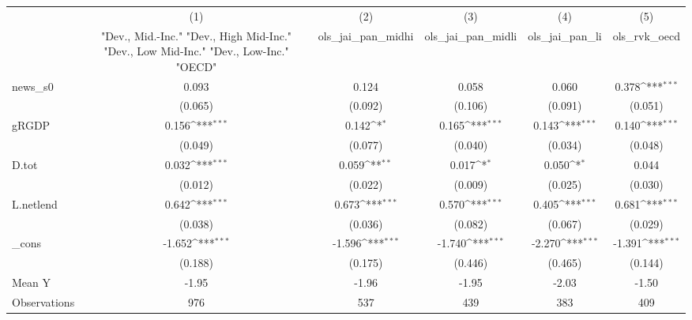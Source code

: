 {
\def\sym#1{\ifmmode^{#1}\else\(^{#1}\)\fi}
\begin{tabular}{l*{5}{c}}
\toprule
            &\multicolumn{1}{c}{(1)}&\multicolumn{1}{c}{(2)}&\multicolumn{1}{c}{(3)}&\multicolumn{1}{c}{(4)}&\multicolumn{1}{c}{(5)}\\
            &\multicolumn{1}{c}{ "Dev., Mid.-Inc." "Dev., High Mid-Inc." "Dev., Low Mid-Inc." "Dev., Low-Inc." "OECD" }&\multicolumn{1}{c}{ols\_jai\_pan\_midhi}&\multicolumn{1}{c}{ols\_jai\_pan\_midli}&\multicolumn{1}{c}{ols\_jai\_pan\_li}&\multicolumn{1}{c}{ols\_rvk\_oecd}\\
\midrule
news\_s0     &       0.093         &       0.124         &       0.058         &       0.060         &       0.378\sym{***}\\
            &     (0.065)         &     (0.092)         &     (0.106)         &     (0.091)         &     (0.051)         \\
\addlinespace
gRGDP       &       0.156\sym{***}&       0.142\sym{*}  &       0.165\sym{***}&       0.143\sym{***}&       0.140\sym{***}\\
            &     (0.049)         &     (0.077)         &     (0.040)         &     (0.034)         &     (0.048)         \\
\addlinespace
D.tot       &       0.032\sym{***}&       0.059\sym{**} &       0.017\sym{*}  &       0.050\sym{*}  &       0.044         \\
            &     (0.012)         &     (0.022)         &     (0.009)         &     (0.025)         &     (0.030)         \\
\addlinespace
L.netlend   &       0.642\sym{***}&       0.673\sym{***}&       0.570\sym{***}&       0.405\sym{***}&       0.681\sym{***}\\
            &     (0.038)         &     (0.036)         &     (0.082)         &     (0.067)         &     (0.029)         \\
\addlinespace
\_cons      &      -1.652\sym{***}&      -1.596\sym{***}&      -1.740\sym{***}&      -2.270\sym{***}&      -1.391\sym{***}\\
            &     (0.188)         &     (0.175)         &     (0.446)         &     (0.465)         &     (0.144)         \\
\midrule
Mean Y      &       -1.95         &       -1.96         &       -1.95         &       -2.03         &       -1.50         \\
Observations&         976         &         537         &         439         &         383         &         409         \\
\bottomrule
\end{tabular}
}
